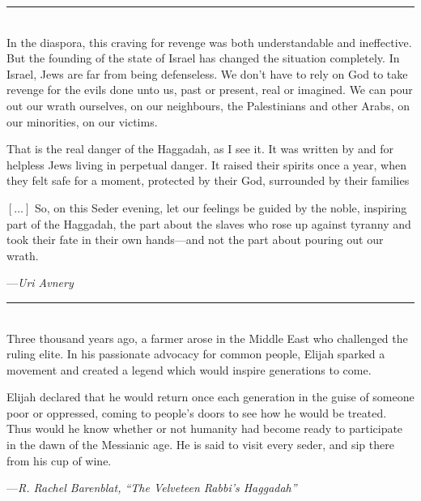 \documentclass[a4paper,10pt,openany]{memoir}
\newcommand{\HgEllipsis}{\ensuremath{\left[\ldots\right]}}
\newcommand{\HgSource}[1]{\hfill{\small---\itshape{#1}}}
\newcommand{\HgFill}{\vfill \hrule \vfill}
\newenvironment{HgEnglish}{\strut\\\noindent}{\vspace{1em}}
\begin{document}
\HgFill

\begin{HgEnglish}
   In the diaspora, this craving for revenge was both understandable and
   ineffective. But the founding of the state of Israel has changed the
   situation completely. In Israel, Jews are far from being defenseless. We
   don’t have to rely on God to take revenge for the evils done unto us, past or
   present, real or imagined. We can pour out our wrath ourselves, on our
   neighbours, the Palestinians and other Arabs, on our minorities, on our
   victims.

   That is the real danger of the Haggadah, as I see it. It was written by and
   for helpless Jews living in perpetual danger. It raised their spirits once a
   year, when they felt safe for a moment, protected by their God, surrounded by
   their families


   \HgEllipsis{} So, on this Seder evening, let our feelings be guided by the
   noble, inspiring part of the Haggadah, the part about the slaves who rose up
   against tyranny and took their fate in their own hands---and not the part
   about pouring out our wrath.

   \HgSource{Uri Avnery}
\end{HgEnglish}

\HgFill

\begin{HgEnglish}
Three thousand years ago, a farmer arose in the Middle East who challenged the
ruling elite. In his passionate advocacy for common people, Elijah sparked a
movement and created a legend which would inspire generations to come.

Elijah declared that he would return once each generation in the guise of
someone poor or oppressed, coming to people's doors to see how he would be
treated. Thus would he know whether or not humanity had become ready to
participate in the dawn of the Messianic age. He is said to visit every seder,
and sip there from his cup of wine.

\HgSource{R. Rachel Barenblat, ``The Velveteen Rabbi's Haggadah''}
\end{HgEnglish}
\end{document}

